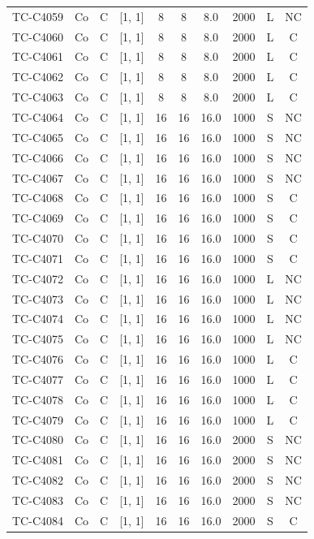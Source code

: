 \begin{longtable}{lccccccccc}
TC-C4059 & Co & C & [1, 1] & 8 & 8 & 8.0 & 2000 & L & NC \\
TC-C4060 & Co & C & [1, 1] & 8 & 8 & 8.0 & 2000 & L & C \\
TC-C4061 & Co & C & [1, 1] & 8 & 8 & 8.0 & 2000 & L & C \\
TC-C4062 & Co & C & [1, 1] & 8 & 8 & 8.0 & 2000 & L & C \\
TC-C4063 & Co & C & [1, 1] & 8 & 8 & 8.0 & 2000 & L & C \\
TC-C4064 & Co & C & [1, 1] & 16 & 16 & 16.0 & 1000 & S & NC \\
TC-C4065 & Co & C & [1, 1] & 16 & 16 & 16.0 & 1000 & S & NC \\
TC-C4066 & Co & C & [1, 1] & 16 & 16 & 16.0 & 1000 & S & NC \\
TC-C4067 & Co & C & [1, 1] & 16 & 16 & 16.0 & 1000 & S & NC \\
TC-C4068 & Co & C & [1, 1] & 16 & 16 & 16.0 & 1000 & S & C \\
TC-C4069 & Co & C & [1, 1] & 16 & 16 & 16.0 & 1000 & S & C \\
TC-C4070 & Co & C & [1, 1] & 16 & 16 & 16.0 & 1000 & S & C \\
TC-C4071 & Co & C & [1, 1] & 16 & 16 & 16.0 & 1000 & S & C \\
TC-C4072 & Co & C & [1, 1] & 16 & 16 & 16.0 & 1000 & L & NC \\
TC-C4073 & Co & C & [1, 1] & 16 & 16 & 16.0 & 1000 & L & NC \\
TC-C4074 & Co & C & [1, 1] & 16 & 16 & 16.0 & 1000 & L & NC \\
TC-C4075 & Co & C & [1, 1] & 16 & 16 & 16.0 & 1000 & L & NC \\
TC-C4076 & Co & C & [1, 1] & 16 & 16 & 16.0 & 1000 & L & C \\
TC-C4077 & Co & C & [1, 1] & 16 & 16 & 16.0 & 1000 & L & C \\
TC-C4078 & Co & C & [1, 1] & 16 & 16 & 16.0 & 1000 & L & C \\
TC-C4079 & Co & C & [1, 1] & 16 & 16 & 16.0 & 1000 & L & C \\
TC-C4080 & Co & C & [1, 1] & 16 & 16 & 16.0 & 2000 & S & NC \\
TC-C4081 & Co & C & [1, 1] & 16 & 16 & 16.0 & 2000 & S & NC \\
TC-C4082 & Co & C & [1, 1] & 16 & 16 & 16.0 & 2000 & S & NC \\
TC-C4083 & Co & C & [1, 1] & 16 & 16 & 16.0 & 2000 & S & NC \\
TC-C4084 & Co & C & [1, 1] & 16 & 16 & 16.0 & 2000 & S & C \\

\end{longtable}
